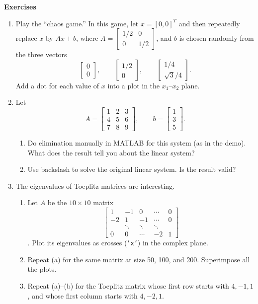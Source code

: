 \documentclass[11pt]{article}
\begin{document}
\begin{center}
  \bf Exercises
\end{center}

\begin{enumerate}
\item Play the ``chaos game.'' In this game, let $x=[0,0]^T$ and then
  repeatedly replace $x$ by $Ax+b$, where $A=\displaystyle
  \begin{bmatrix}
    1/2&0\\0&1/2
  \end{bmatrix}$, and $b$ is chosen randomly from the three vectors
\[
\begin{bmatrix}
  0\\0
\end{bmatrix}, \qquad
\begin{bmatrix}
  1/2\\0
\end{bmatrix},\qquad
\begin{bmatrix}
  1/4\\ \sqrt{3}/4
\end{bmatrix}.
\]
Add a dot for each value of $x$ into a plot in the $x_1$--$x_2$
plane.
\item Let 
\[
A=
\begin{bmatrix}
  1&2&3\\4&5&6\\7&8&9
\end{bmatrix}, \qquad b=
\begin{bmatrix}
  1\\3\\5
\end{bmatrix}.
\]

\begin{enumerate}
\item Do elimination manually in MATLAB for this system (as in the
  demo). What does the result tell you about the linear system?
\item Use backslash to solve the original linear system. Is the result valid?
\end{enumerate}

\item The eigenvalues of Toeplitz matrices are interesting.
  \begin{enumerate}
  \item Let $A$ be the $10\times 10$ matrix
    \[
    \begin{bmatrix}
      1 & -1 & 0 & \cdots & 0 \\
      -2 & 1 & -1 & \cdots & 0 \\
      & \ddots & \ddots & \ddots & \\
      0 & 0 & \cdots & -2 & 1 
    \end{bmatrix}
    \].
    Plot its eigenvalues as crosses (\texttt{'x'}) in the complex plane.
  \item Repeat (a) for the same matrix at size 50, 100, and
    200. Superimpose all the plots.
  \item Repeat (a)--(b) for the Toeplitz matrix whose first row starts
    with $4,-1,1$, and whose first column starts with $4,-2,1$. 
 \end{enumerate}

\end{enumerate}
\end{document}
